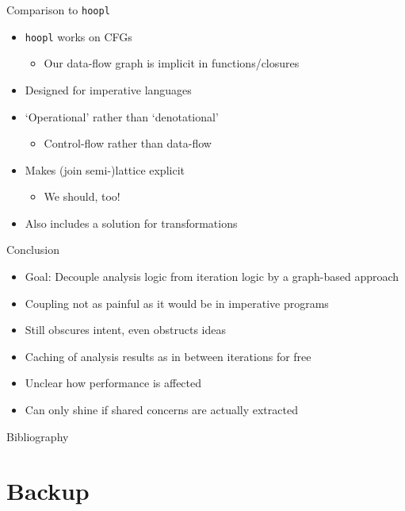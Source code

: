 \documentclass{haskellbeamer}
\begin{document}
\begin{frame}{Comparison to \texttt{hoopl}}
  \begin{itemize}
    \item \texttt{hoopl} \parencite{hoopl} works on CFGs
      \begin{itemize}
        \item Our data-flow graph is implicit in functions/closures
      \end{itemize}
    \item Designed for imperative languages
    \item `Operational' rather than `denotational'
      \begin{itemize}
        \item Control-flow rather than data-flow
      \end{itemize}
    \item Makes (join semi-)lattice explicit
      \begin{itemize}
        \item We should, too!
      \end{itemize}
    \item Also includes a solution for transformations
  \end{itemize}
\end{frame}

\begin{frame}{Conclusion}
  \begin{itemize}
    \item[\cmark] Goal: Decouple analysis logic from iteration logic by a graph-based approach
    \item[\xmark] Coupling not as painful as it would be in imperative programs
    \item[\cmark] Still obscures intent, even obstructs ideas
    \item[\cmark] Caching of analysis results as in \textcite{dmd} between iterations for free
    \item[\xmark] Unclear how performance is affected
    \item[\xmark] Can only shine if shared concerns are actually extracted
  \end{itemize}
\end{frame}

\begin{frame}{Bibliography} 
  \printbibliography
\end{frame}

\section{Backup}
\end{document}
